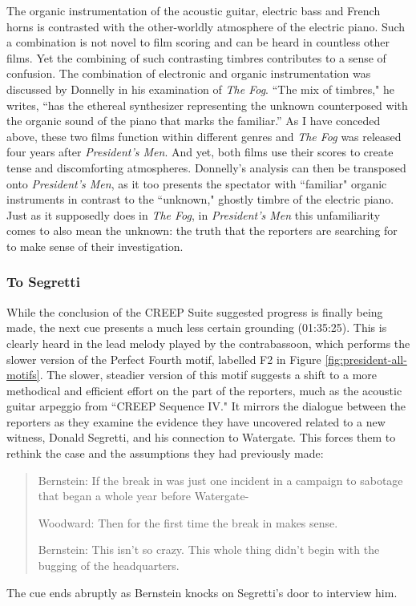 The organic instrumentation of the acoustic guitar, electric bass and French horns is contrasted with the other-worldly atmosphere of the electric piano.
Such a combination is not novel to film scoring and can be heard in countless other films.
Yet the combining of such contrasting timbres contributes to a sense of confusion.
The combination of electronic and organic instrumentation was discussed by Donnelly in his examination of \textit{The Fog}.
``The mix of timbres," he writes, ``has the ethereal synthesizer representing the unknown counterposed with the organic sound of the piano that marks the familiar.”\autocites[][156]{donnelly_hearing_2010}
As I have conceded above, these two films function within different genres and \textit{The Fog} was released four years after \textit{President's Men}.
And yet, both films use their scores to create tense and discomforting atmospheres.
Donnelly's analysis can then be transposed onto \textit{President's Men}, as it too presents the spectator with ``familiar" organic instruments in contrast to the ``unknown," ghostly timbre of the electric piano.
Just as it supposedly does in \textit{The Fog}, in \textit{President’s Men }this unfamiliarity comes to also mean the unknown: the truth that the reporters are searching for to make sense of their investigation.


\subsubsection{To Segretti}

While the conclusion of the CREEP Suite suggested progress is finally being made, the next cue presents a much less certain grounding (01:35:25).
This is clearly heard in the lead melody played by the contrabassoon, which performs the slower version of the Perfect Fourth motif, labelled F2 in Figure \ref{fig:president-all-motifs}.
The slower, steadier version of this motif suggests a shift to a more methodical and efficient effort on the part of the reporters, much as the acoustic guitar arpeggio from ``CREEP Sequence IV."
It mirrors the dialogue between the reporters as they examine the evidence they have uncovered related to a new witness, Donald Segretti, and his connection to Watergate.
This forces them to rethink the case and the assumptions they had previously made:
\begin{quote}
Bernstein: If the break in was just one incident in a campaign to sabotage that began a whole year before Watergate-

Woodward: Then for the first time the break in makes sense.

Bernstein: This isn’t so crazy. This whole thing didn’t begin with the bugging of the headquarters.

\end{quote}
The cue ends abruptly as Bernstein knocks on Segretti’s door to interview him.


